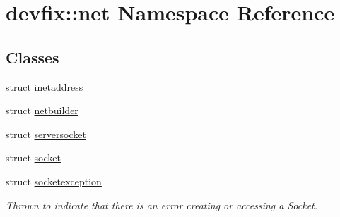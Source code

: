 \hypertarget{namespacedevfix_1_1net}{}\section{devfix\+:\+:net Namespace Reference}
\label{namespacedevfix_1_1net}
\subsection*{Classes}
\begin{DoxyCompactItemize}
\item 
struct \hyperlink{structdevfix_1_1net_1_1inetaddress}{inetaddress}
\item 
struct \hyperlink{structdevfix_1_1net_1_1netbuilder}{netbuilder}
\item 
struct \hyperlink{structdevfix_1_1net_1_1serversocket}{serversocket}
\item 
struct \hyperlink{structdevfix_1_1net_1_1socket}{socket}
\item 
struct \hyperlink{structdevfix_1_1net_1_1socketexception}{socketexception}
\begin{DoxyCompactList}\small\item\em Thrown to indicate that there is an error creating or accessing a Socket. \end{DoxyCompactList}\end{DoxyCompactItemize}
